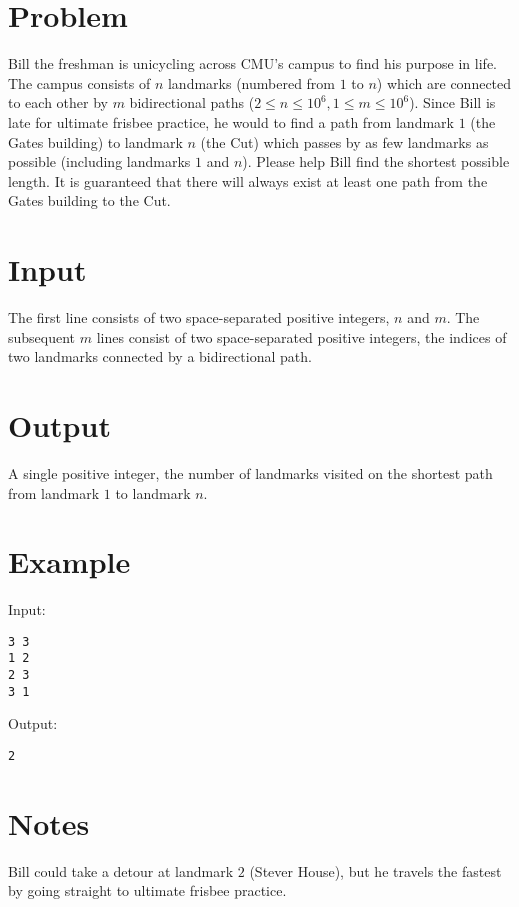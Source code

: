 \documentclass[11pt]{article}
\begin{document}
\section*{Problem}
Bill the freshman is unicycling across CMU's campus to find his purpose in life. The campus consists of $n$ landmarks (numbered from $1$ to $n$) which are connected to each other by $m$ bidirectional paths ($2 \le n \le 10^6, 1 \le  m \le  10^6$). Since Bill is late for ultimate frisbee practice, he would to find a path from landmark $1$ (the Gates building) to landmark $n$ (the Cut) which passes by as few landmarks as possible (including landmarks $1$ and $n$). Please help Bill find the shortest possible length. It is guaranteed that there will always exist at least one path from the Gates building to the Cut.

\section*{Input}
The first line consists of two space-separated positive integers, $n$ and $m$. The subsequent $m$ lines consist of two space-separated positive integers, the indices of two landmarks connected by a bidirectional path.
\section*{Output}
A single positive integer, the number of landmarks visited on the shortest path from landmark $1$ to landmark $n$.
\section*{Example}
Input:

\begin{verbatim}
3 3
1 2
2 3
3 1
\end{verbatim}

\noindent Output:
\begin{verbatim}
2
\end{verbatim}

\section*{Notes}
Bill could take a detour at landmark $2$ (Stever House), but he travels the fastest by going straight to ultimate frisbee practice.
\end{document}

